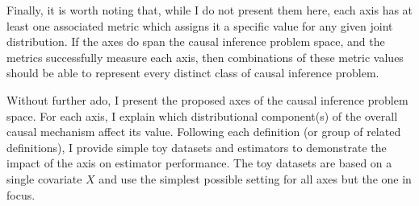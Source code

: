 \documentclass[../main.tex]{subfiles}
\begin{document}
\vspace{\baselineskip}
Finally, it is worth noting that, while I do not present them here, each axis has at least one associated metric which assigns it a specific value for any given joint distribution. If the axes do span the causal inference problem space,  and the metrics successfully measure each axis, then combinations of these metric values should be able to represent every distinct class of causal inference problem.\par


\vspace{\baselineskip}
Without further ado, I present the proposed axes of the causal inference problem space. For each axis, I explain which distributional component(s) of the overall causal mechanism affect its value. Following each definition (or group of related definitions), I provide simple toy datasets and estimators to demonstrate the impact of the axis on estimator performance. The toy datasets are based on a single covariate  \( X \) and use the simplest possible setting for all axes but the one in focus.\par
\end{document}

